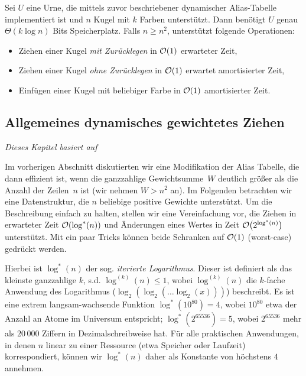 \begin{theorem}
    Sei $U$ eine Urne, die mittels zuvor beschriebener dynamischer Alias-Tabelle implementiert ist und $n$ Kugel mit $k$ Farben unterstützt.
    Dann benötigt $U$ genau $\Theta(k \log n)$ Bits Speicherplatz.
    Falls $n \ge n^2$, unterstützt folgende Operationen:
    \begin{itemize}
        \item Ziehen einer Kugel \emph{mit Zurücklegen} in $\mathcal{O}\!\left(1\right)$ erwarteter Zeit,
        \item Ziehen einer Kugel \emph{ohne Zurücklegen} in $\mathcal{O}\!\left(1\right)$ erwartet amortisierter Zeit,
        \item Einfügen einer Kugel mit beliebiger Farbe in $\mathcal{O}\!\left(1\right)$ amortisierter Zeit.
    \end{itemize}
\end{theorem}

\goodbreak

\subsection{Allgemeines dynamisches gewichtetes Ziehen}
\label{subsec:matias}
\emph{Dieses Kapitel basiert auf \cite{DBLP:journals/mst/MatiasVN03}}

\bigskip
\def\lgs{\ensuremath{\log^*}}

Im vorherigen Abschnitt diskutierten wir eine Modifikation der Alias Tabelle, die dann effizient ist, wenn die ganzzahlige Gewichtsumme~$W$ deutlich größer als die Anzahl der Zeilen~$n$ ist (wir nehmen $W > n^2$ an).
Im Folgenden betrachten wir eine Datenstruktur, die $n$ beliebige positive Gewichte unterstützt.
Um die Beschreibung einfach zu halten, stellen wir eine Vereinfachung vor, die Ziehen in erwarteter Zeit $\Oh{\lgs(n)}$ und Änderungen eines Wertes in Zeit $\Oh{2^{\lgs(n)}}$ unterstützt.
Mit ein paar Tricks können beide Schranken auf $\mathcal{O}\!\left(1\right)$ (worst-case) gedrückt werden.

Hierbei  ist $\lgs(n)$ der sog. \emph{iterierte Logarithmus}.
Dieser ist definiert als das kleinste ganzzahlige $k$, s.d. $\log^{(k)}(n) \le 1$, wobei $\log^{(k)}(n)$ die $k$-fache Anwendung des Logarithmus ($\log_2(\log_2(\ldots \log_2(x)))$) beschreibt.
Es ist eine extrem langsam-wachsende Funktion $\lgs(10^{80}) = 4$, wobei $10^{80}$ etwa der Anzahl an Atome im Universum entspricht;
$\lgs({2^{65536}})=5$, wobei $2^{65536}$ mehr als $20\,000$ Ziffern in Dezimalschreibweise hat.
Für alle praktischen Anwendungen, in denen $n$ linear zu einer Ressource (etwa Speicher oder Laufzeit) korrespondiert, können wir $\lgs(n)$ daher als Konstante von höchstens $4$ annehmen.

